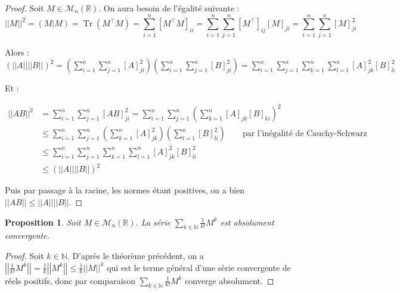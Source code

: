 \documentclass[a4paper]{article}
\newtheorem*{proposition}{Proposition}
\begin{document}
\begin{proof}

    Soit $M \in \mathcal{M}_{n}(\mathbb{R})$. On aura besoin de l'égalité suivante :
    $$\left|\left|M\right|\right|^2 = \left(M|M\right) = \operatorname{Tr}\left(M^\top M\right) = \sum_{i=1}^n \left[M^\top M\right]_{ii} = \sum_{i=1}^n\sum_{j=1}^n \left[M^\top\right]_{ij} \left[M\right]_{ji} = \sum_{i=1}^n\sum_{j=1}^n \left[M\right]_{ji}^2$$
    
    Alors : $\displaystyle \left(\left|\left|A\right|\right|\left|\left|B\right|\right|\right)^2 = \left(\sum_{i=1}^n\sum_{j=1}^n \left[A\right]_{ji}^2\right) \left(\sum_{i=1}^n\sum_{j=1}^n \left[B\right]_{ji}^2\right) = \sum_{i=1}^n  \sum_{j=1}^n  \sum_{k=1}^n  \sum_{l=1}^n \left[A\right]_{jk}^2 \left[B\right]_{li}^2$
    
    Et :
    
    \begin{align*}
        \left|\left|AB\right|\right|^2 &= \sum_{i=1}^n  \sum_{j=1}^n \left[AB\right]_{ji}^2 = \sum_{i=1}^n  \sum_{j=1}^n \left(\sum_{k=1}^n \left[A\right]_{jk} \left[B\right]_{ki}\right)^2 \\
        & \leq \sum_{i=1}^n  \sum_{j=1}^n \left(\sum_{k=1}^n \left[A\right]_{jk}^2\right) \left(\sum_{l=1}^n \left[B\right]_{li}^2\right) \qquad \text{par l'inégalité de Cauchy-Schwarz}\\
        & \leq \sum_{i=1}^n  \sum_{j=1}^n  \sum_{k=1}^n  \sum_{l=1}^n \left[A\right]_{jk}^2 \left[B\right]_{li}^2 \\
        & \leq \left(\left|\left|A\right|\right|\left|\left|B\right|\right|\right)^2
    \end{align*}
    
    Puis par passage à la racine, les normes étant positives, on a bien $\left|\left| AB \right|\right| \leq \left|\left| A \right|\right| \left|\left| B \right|\right|$.

    
\end{proof}

\begin{proposition}
    Soit $M \in \mathcal{M}_{n}(\mathbb{R})$. La série $\displaystyle \sum_{k \in \mathbb{N}} \frac{1}{k!}M^k$ est absolument convergente.
\end{proposition}

\begin{proof}
    Soit $k \in \mathbb{N}$. D'après le théorème précédent, on a $\displaystyle \left|\left|\frac{1}{k!}M^k\right|\right| = \frac{1}{k}\left|\left|M^k\right|\right| \leq \frac{1}{k}\left|\left|M\right|\right|^k$ qui est le terme général d'une série convergente de réels positifs, donc par comparaison $\displaystyle \sum_{k \in \mathbb{N}} \frac{1}{k!}M^k$ converge absolument.
\end{proof}
\end{document}
